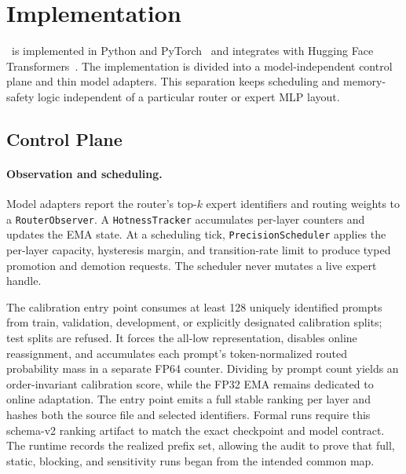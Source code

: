 \section{Implementation}
\label{sec:impl}

\systemname\ is implemented in Python and PyTorch~\cite{paszke2019pytorch} and integrates with Hugging Face Transformers~\cite{wolf2020transformers}. The implementation is divided into a model-independent control plane and thin model adapters. This separation keeps scheduling and memory-safety logic independent of a particular router or expert MLP layout.

\subsection{Control Plane}

\paragraph{Observation and scheduling.}
Model adapters report the router's top-$k$ expert identifiers and routing weights to a \texttt{RouterObserver}. A \texttt{HotnessTracker} accumulates per-layer counters and updates the EMA state. At a scheduling tick, \texttt{PrecisionScheduler} applies the per-layer capacity, hysteresis margin, and transition-rate limit to produce typed promotion and demotion requests. The scheduler never mutates a live expert handle.

The calibration entry point consumes at least 128 uniquely identified prompts from train, validation, development, or explicitly designated calibration splits; test splits are refused. It forces the all-low representation, disables online reassignment, and accumulates each prompt's token-normalized routed probability mass in a separate FP64 counter. Dividing by prompt count yields an order-invariant calibration score, while the FP32 EMA remains dedicated to online adaptation. The entry point emits a full stable ranking per layer and hashes both the source file and selected identifiers. Formal runs require this schema-v2 ranking artifact to match the exact checkpoint and model contract. The runtime records the realized prefix set, allowing the audit to prove that full, static, blocking, and sensitivity runs began from the intended common map.


